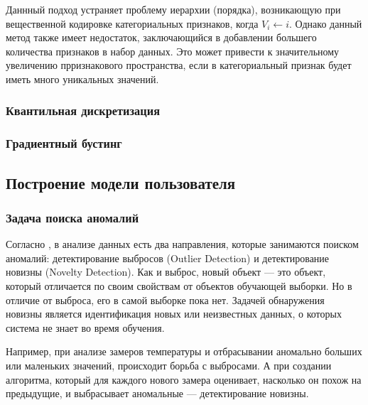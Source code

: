 \documentclass[12pt]{article}
\begin{document}
    \par Даннный подход устраняет проблему иерархии (порядка), возникающую при вещественной кодировке категориальных признаков, когда $V_i \longleftarrow i$. Однако данный метод также имеет недостаток, заключающийся в добавлении большего количества признаков в набор данных. Это может привести к значительному увеличению прризнакового пространства, если в категориальный признак будет иметь много уникальных значений.
    

    \subsubsection{Квантильная дискретизация}
    \label{sec:Research:FeatureSpace:Quantile}

    \subsubsection{Градиентный бустинг}
    \label{sec:Research:FeatureSpace:GradientBoostingClassifier}

    \newpage


    \subsection{Построение модели пользователя}
    \label{sec:Research:Model}
    
    \subsubsection{Задача поиска аномалий}
    \label{sec:Research:Model:Anomaly}

    \par Согласно \cite{Dyakonov, NoveltyDetection}, в анализе данных есть два направления, которые занимаются поиском аномалий: детектирование выбросов (Outlier Detection) и детектирование новизны (Novelty Detection). Как и выброс, новый объект — это объект, который отличается по своим свойствам от объектов обучающей выборки. Но в отличие от выброса, его в самой выборке пока нет. Задачей обнаружения новизны является идентификация новых или неизвестных данных, о которых система не знает во время обучения. \\

    \par Например, при анализе замеров температуры и отбрасывании аномально больших или маленьких значений, происходит борьба с выбросами. А при создании алгоритма, который для каждого нового замера оценивает, насколько он похож на предыдущие, и выбрасывает аномальные — детектирование новизны. \\
\end{document}
